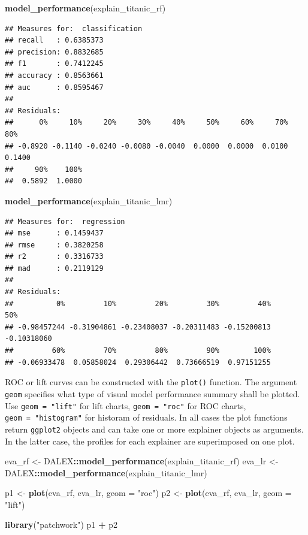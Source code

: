 \documentclass[]{krantz}
\newenvironment{Shaded}{\begin{snugshade}}{\end{snugshade}}
\newcommand{\DataTypeTok}[1]{\textcolor[rgb]{0.13,0.29,0.53}{#1}}
\newcommand{\KeywordTok}[1]{\textcolor[rgb]{0.13,0.29,0.53}{\textbf{#1}}}
\newcommand{\NormalTok}[1]{#1}
\newcommand{\OperatorTok}[1]{\textcolor[rgb]{0.81,0.36,0.00}{\textbf{#1}}}
\newcommand{\StringTok}[1]{\textcolor[rgb]{0.31,0.60,0.02}{#1}}
\begin{document}
\begin{Shaded}
\begin{Highlighting}[]
\KeywordTok{model_performance}\NormalTok{(explain_titanic_rf)}
\end{Highlighting}
\end{Shaded}

\begin{verbatim}
## Measures for:  classification
## recall   : 0.6385373 
## precision: 0.8832685 
## f1       : 0.7412245 
## accuracy : 0.8563661 
## auc      : 0.8595467
## 
## Residuals:
##      0%     10%     20%     30%     40%     50%     60%     70%     80% 
## -0.8920 -0.1140 -0.0240 -0.0080 -0.0040  0.0000  0.0000  0.0100  0.1400 
##     90%    100% 
##  0.5892  1.0000
\end{verbatim}

\begin{Shaded}
\begin{Highlighting}[]
\KeywordTok{model_performance}\NormalTok{(explain_titanic_lmr)}
\end{Highlighting}
\end{Shaded}

\begin{verbatim}
## Measures for:  regression
## mse      : 0.1459437 
## rmse     : 0.3820258 
## r2       : 0.3316733 
## mad      : 0.2119129
## 
## Residuals:
##          0%         10%         20%         30%         40%         50% 
## -0.98457244 -0.31904861 -0.23408037 -0.20311483 -0.15200813 -0.10318060 
##         60%         70%         80%         90%        100% 
## -0.06933478  0.05858024  0.29306442  0.73666519  0.97151255
\end{verbatim}

ROC or lift curves can be constructed with the \texttt{plot()} function. The argument \texttt{geom} specifies what type of visual model performance summary shall be plotted. Use \texttt{geom\ =\ "lift"} for lift charts, \texttt{geom\ =\ "roc"} for ROC charts, \texttt{geom\ =\ "histogram"} for historam of residuals.
In all cases the plot functions return \texttt{ggplot2} objects and can take one or more explainer objects as arguments. In the latter case, the profiles for each explainer are superimposed on one plot.

\begin{Shaded}
\begin{Highlighting}[]
\NormalTok{eva_rf <-}\StringTok{ }\NormalTok{DALEX}\OperatorTok{::}\KeywordTok{model_performance}\NormalTok{(explain_titanic_rf)}
\NormalTok{eva_lr <-}\StringTok{ }\NormalTok{DALEX}\OperatorTok{::}\KeywordTok{model_performance}\NormalTok{(explain_titanic_lmr)}

\NormalTok{p1 <-}\StringTok{ }\KeywordTok{plot}\NormalTok{(eva_rf, eva_lr, }\DataTypeTok{geom =} \StringTok{"roc"}\NormalTok{)}
\NormalTok{p2 <-}\StringTok{ }\KeywordTok{plot}\NormalTok{(eva_rf, eva_lr, }\DataTypeTok{geom =} \StringTok{"lift"}\NormalTok{)}

\KeywordTok{library}\NormalTok{(}\StringTok{"patchwork"}\NormalTok{)}
\NormalTok{p1 }\OperatorTok{+}\StringTok{ }\NormalTok{p2}
\end{Highlighting}
\end{Shaded}
\end{document}

